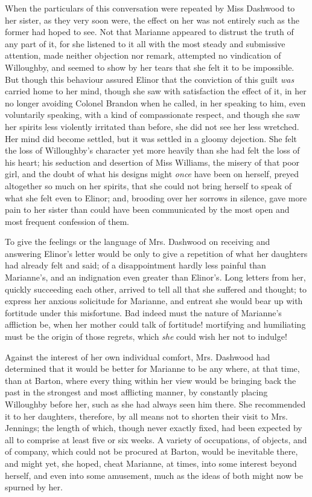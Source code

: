 When the particulars of this conversation were repeated by Miss Dashwood to her sister, as they very soon were, the effect on her was not entirely such as the former had hoped to see. Not that Marianne appeared to distrust the truth of any part of it, for she listened to it all with the most steady and submissive attention, made neither objection nor remark, attempted no vindication of Willoughby, and seemed to show by her tears that she felt it to be impossible. But though this behaviour assured Elinor that the conviction of this guilt {\em was} carried home to her mind, though she saw with satisfaction the effect of it, in her no longer avoiding Colonel Brandon when he called, in her speaking to him, even voluntarily speaking, with a kind of compassionate respect, and though she saw her spirits less violently irritated than before, she did not see her less wretched. Her mind did become settled, but it was settled in a gloomy dejection. She felt the loss of Willoughby's character yet more heavily than she had felt the loss of his heart; his seduction and desertion of Miss Williams, the misery of that poor girl, and the doubt of what his designs might {\em once} have been on herself, preyed altogether so much on her spirits, that she could not bring herself to speak of what she felt even to Elinor; and, brooding over her sorrows in silence, gave more pain to her sister than could have been communicated by the most open and most frequent confession of them.

To give the feelings or the language of Mrs. Dashwood on receiving and answering Elinor's letter would be only to give a repetition of what her daughters had already felt and said; of a disappointment hardly less painful than Marianne's, and an indignation even greater than Elinor's. Long letters from her, quickly succeeding each other, arrived to tell all that she suffered and thought; to express her anxious solicitude for Marianne, and entreat she would bear up with fortitude under this misfortune. Bad indeed must the nature of Marianne's affliction be, when her mother could talk of fortitude! mortifying and humiliating must be the origin of those regrets, which {\em she} could wish her not to indulge!

Against the interest of her own individual comfort, Mrs. Dashwood had determined that it would be better for Marianne to be any where, at that time, than at Barton, where every thing within her view would be bringing back the past in the strongest and most afflicting manner, by constantly placing Willoughby before her, such as she had always seen him there. She recommended it to her daughters, therefore, by all means not to shorten their visit to Mrs. Jennings; the length of which, though never exactly fixed, had been expected by all to comprise at least five or six weeks. A variety of occupations, of objects, and of company, which could not be procured at Barton, would be inevitable there, and might yet, she hoped, cheat Marianne, at times, into some interest beyond herself, and even into some amusement, much as the ideas of both might now be spurned by her.

